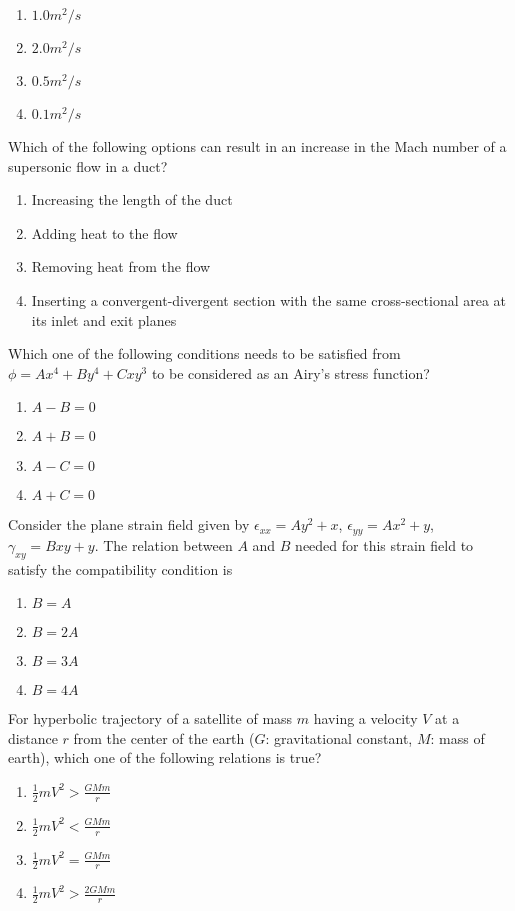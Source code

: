     		
    		
		\begin{enumerate}
			\item $1.0 m^{2}/s$
			\item $2.0 m^{2}/s$
			\item $0.5 m^{2}/s$
			\item $0.1 m^{2}/s$
		\end{enumerate}	
	\item 
	Which of the following options can result in an increase in the Mach number of a supersonic flow in a duct?
		\begin{enumerate}
			\item Increasing the length of the duct
			\item Adding heat to the flow
			\item Removing heat from the flow
			\item Inserting a convergent-divergent section with the same cross-sectional area at its inlet and exit planes
		\end{enumerate}
	\item
	Which one of the following conditions needs to be satisfied from $\phi = Ax^{4} + By^{4} + Cxy^{3}$ to be considered as an Airy's stress function?
		\begin{enumerate}
			\item $A - B = 0$
			\item $A + B = 0$
			\item $A - C = 0$
			\item $A + C = 0$
		\end{enumerate}
	\item
	Consider the plane strain field given by $\epsilon_{xx} = Ay^{2} + x$, $\epsilon_{yy} = Ax^{2} + y$, $\gamma_{xy} = Bxy + y$. The relation between $A$ and $B$ needed for this strain field to satisfy the compatibility condition is
		\begin{enumerate}
			\item $B = A$
			\item $B = 2A$
			\item $B = 3A$
			\item $B = 4A$
		\end{enumerate}
	\item
	For hyperbolic trajectory of a satellite of mass $m$ having a velocity $V$ at a distance $r$ from the center of the earth ($G$: gravitational constant, $M$: mass of earth), which one of the following relations is true?
		\begin{enumerate}
			\item $\frac{1}{2}mV^{2} > \frac{GMm}{r}$
			\item $\frac{1}{2}mV^{2} < \frac{GMm}{r}$
			\item $\frac{1}{2}mV^{2} = \frac{GMm}{r}$
			\item $\frac{1}{2}mV^{2} > \frac{2GMm}{r}$
		\end{enumerate}	

